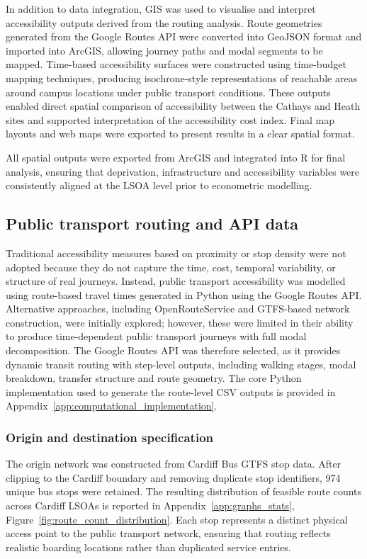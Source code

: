 \documentclass[11pt,a4paper]{article}
\begin{document}
In addition to data integration, GIS was used to visualise and interpret accessibility outputs derived from the routing analysis. Route geometries generated from the Google Routes API were converted into GeoJSON format and imported into ArcGIS, allowing journey paths and modal segments to be mapped. Time-based accessibility surfaces were constructed using time-budget mapping techniques, producing isochrone-style representations of reachable areas around campus locations under public transport conditions. These outputs enabled direct spatial comparison of accessibility between the Cathays and Heath sites and supported interpretation of the accessibility cost index. Final map layouts and web maps were exported to present results in a clear spatial format.

All spatial outputs were exported from ArcGIS and integrated into R for final analysis, ensuring that deprivation, infrastructure and accessibility variables were consistently aligned at the LSOA level prior to econometric modelling.

\subsection{Public transport routing and API data}

Traditional accessibility measures based on proximity or stop density were not adopted because they do not capture the time, cost, temporal variability, or structure of real journeys. Instead, public transport accessibility was modelled using route-based travel times generated in Python using the Google Routes API. Alternative approaches, including OpenRouteService and GTFS-based network construction, were initially explored; however, these were limited in their ability to produce time-dependent public transport journeys with full modal decomposition. The Google Routes API was therefore selected, as it provides dynamic transit routing with step-level outputs, including walking stages, modal breakdown, transfer structure and route geometry. The core Python implementation used to generate the route-level CSV outputs is provided in Appendix~\ref{app:computational_implementation}.

\subsubsection{Origin and destination specification}

The origin network was constructed from Cardiff Bus GTFS stop data. After clipping to the Cardiff boundary and removing duplicate stop identifiers, 974 unique bus stops were retained. The resulting distribution of feasible route counts across Cardiff LSOAs is reported in Appendix~\ref{app:graphs_stats}, Figure~\ref{fig:route_count_distribution}. Each stop represents a distinct physical access point to the public transport network, ensuring that routing reflects realistic boarding locations rather than duplicated service entries.
\end{document}
